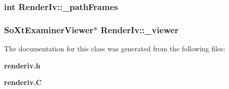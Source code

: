 \subsubsection{\setlength{\rightskip}{0pt plus 5cm}int Render\-Iv::\_\-path\-Frames\hspace{0.3cm}{\tt  [protected]}}\label{class_RenderIv_n8}


\subsubsection{\setlength{\rightskip}{0pt plus 5cm}So\-Xt\-Examiner\-Viewer$\ast$ Render\-Iv::\_\-viewer\hspace{0.3cm}{\tt  [protected]}}\label{class_RenderIv_n0}




The documentation for this class was generated from the following files:\begin{CompactItemize}
\item 
{\bf renderiv.h}\item 
{\bf renderiv.C}\end{CompactItemize}
